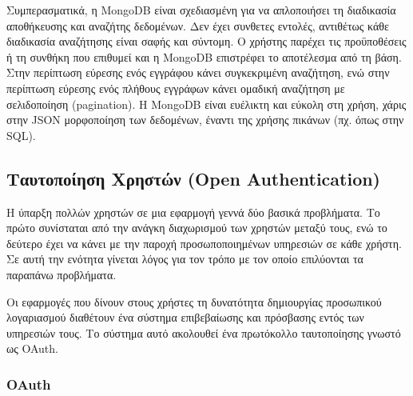Συμπερασματικά, η MongoDB είναι σχεδιασμένη για να απλοποιήσει τη διαδικασία αποθήκευσης και αναζήτης δεδομένων. Δεν έχει συνθετες εντολές, αντιθέτως κάθε διαδικασία αναζήτησης είναι σαφής και σύντομη. Ο χρήστης παρέχει τις προϋποθέσεις ή τη συνθήκη που επιθυμεί και η MongoDB επιστρέφει το αποτέλεσμα από τη βάση. Στην περίπτωση εύρεσης ενός εγγράφου κάνει συγκεκριμένη αναζήτηση, ενώ στην περίπτωση εύρεσης ενός πλήθους εγγράφων κάνει ομαδική αναζήτηση με σελιδοποίηση (pagination). Η MongoDB  είναι ευέλικτη και εύκολη στη χρήση, χάρις στην JSON μορφοποίηση των δεδομένων, έναντι της χρήσης πικάνων (πχ. όπως στην SQL). 


\subsection{Tαυτοποίηση Χρηστών (Open Authentication)}

Η ύπαρξη πολλών χρηστών σε μια εφαρμογή γεννά δύο βασικά προβλήματα. Το πρώτο συνίσταται από την ανάγκη διαχωρισμού των χρηστών μεταξύ τους, ενώ το δεύτερο έχει να κάνει με την παροχή προσωποποιημένων υπηρεσιών σε κάθε χρήστη. Σε αυτή την ενότητα γίνεται λόγος για τον τρόπο με τον οποίο επιλύονται τα παραπάνω προβλήματα. 

Οι εφαρμογές που δίνουν στους χρήστες τη δυνατότητα δημιουργίας προσωπικού λογαριασμού διαθέτουν ένα σύστημα επιβεβαίωσης και πρόσβασης εντός των υπηρεσιών τους. Το σύστημα αυτό ακολουθεί ένα πρωτόκολλο ταυτοποίησης γνωστό ως OAuth.

\subsubsection{OAuth}

